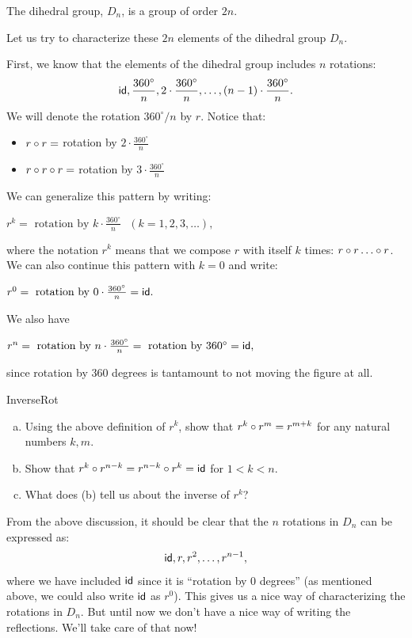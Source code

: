 
\begin{prop}{}
The dihedral group, $D_n$, is a group of order $2n$.
\end{prop}
 

Let us try to characterize these $2n$ elements of the dihedral group $D_n$. 
\medskip

First, we know that the elements of the dihedral group includes $n$ rotations:
\[
{\sf{i}d}, \frac{360^{\circ} }{n}, 2 \cdot \frac{360^{\circ} }{n},
\ldots, (n-1) \cdot \frac{360^{\circ} }{n}.
\]
We will denote the rotation $360^{\circ} /n$ by $r$. Notice that:
\begin{itemize}
\item
$r \circ r = $ rotation by  $2 \cdot \frac{360^{\circ} }{n}$
\item
$r \circ r \circ r = $ rotation by  $3 \cdot \frac{360^{\circ} }{n}$
\end{itemize}

\noindent
We can generalize this pattern by writing:
\medskip

$r^k = \mbox{ rotation by } k \cdot \frac{360^{\circ} }{n}~~~(k=1,2,3,\ldots),$
\medskip

\noindent
where the notation $r^k$ means that we compose  $r$ with itself $k$ times: $r \circ r \ldots \circ r$.
We can also continue this pattern with $k=0$ and  write:
\medskip

$r^0 = \mbox{ rotation by } 0 \cdot \frac{360^{\circ} }{n} = \sf{id}.$
\medskip

We also have
\medskip

$r^n = \mbox{ rotation by } n \cdot \frac{360^{\circ} }{n} = \mbox{ rotation by } 360^{\circ} = {\sf{i}d},$
\medskip

\noindent
since rotation by 360 degrees is tantamount to not moving the figure at all.


\begin{exercise}{InverseRot}
\begin{enumerate}[(a)]
\item
Using the above definition of $r^k$, show that $r^k \circ r^m = r^{m+k}$ for any natural numbers $k,m$.
\item
Show that $r^k \circ r^{n-k} = r^{n-k} \circ r^k = {\sf{i}d}$
 for $1 < k < n$.  
\item
What does (b) tell us about the inverse of $r^k$?
\end{enumerate}
\end{exercise}

From the above discussion, it should be clear that the $n$ rotations in $D_n$ can be expressed as:
\[{\sf{i}d}, r, r^2, \ldots, r^{n-1},\]
where we have included ${\sf{i}d}$ since it is ``rotation by 0 degrees'' (as mentioned above, we could also write $\sf{id}$ as $r^0$).  This gives us a nice way of characterizing the rotations in $D_n$.  But until now we don't have a nice way of writing the reflections. We'll take care of that now!

